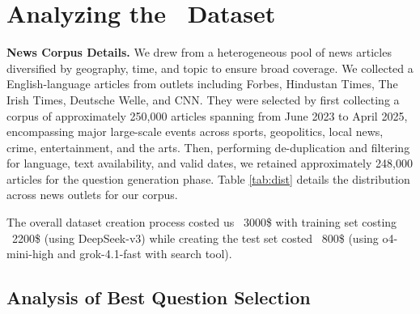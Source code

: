 \clearpage
\section{Analyzing the \ourdataset \ Dataset}
\label{sec:dataset_details}

\begin{table}
\vspace{-0.4cm}
\caption{Breakdown of source news articles by news outlet.}
\vspace{-0.25cm}
\vspace{-0.3cm}
\label{tab:dist}
\end{table}
\textbf{News Corpus Details.} We drew from a heterogeneous pool of news articles diversified by geography, time, and topic to ensure broad coverage. We collected a English-language articles from outlets including Forbes, Hindustan Times, The Irish Times, Deutsche Welle, and CNN. They were selected by first collecting a corpus of approximately 250,000 articles spanning from June 2023 to April 2025, encompassing major large-scale events across sports, geopolitics, local news, crime, entertainment, and the arts. Then, performing de-duplication and filtering for language, text availability, and valid dates, we retained approximately 248,000 articles for the question generation phase. Table \ref{tab:dist} details the distribution across news outlets for our corpus. 


The overall dataset creation process costed us ~3000\$ with training set costing ~2200\$ (using DeepSeek-v3) while creating the test set costed ~800\$ (using o4-mini-high and grok-4.1-fast with search tool). 


\vspace{0.15cm}

\subsection{Analysis of Best Question Selection}


